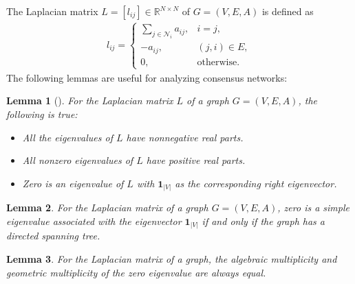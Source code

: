 \documentclass{ifacconf}
\newtheorem{lemma}{Lemma}[section]
\begin{document}
The Laplacian matrix $L = [l_{ij}] \in \mathbb{R}^{N \times N}$ of $G=({V}, {E}, A)$ is defined as
\begin{align}
l_{ij} = \left \{ \begin{array}{ll}
\sum_{j \in \mathcal{N}_{i}} a_{ij}, & i=j, \\
-a_{ij},  & (j,i) \in E,  \\
0, & \mathrm{otherwise}.
\end{array}	\right.	\nonumber
\end{align}
The following lemmas are useful for analyzing consensus networks:
\begin{lemma} [\cite{godsil2001algebraic}] \label{lemma_Laplacian_1} 
For the Laplacian matrix $L$ of a graph $G = (V,E,A)$, the following is true:
\begin{itemize}
    \item All the eigenvalues of $L$ have nonnegative real parts.
    \item All nonzero eigenvalues of $L$ have positive real parts.
    \item Zero is an eigenvalue of $L$ with $\mathbf{1}_{|V|}$ as the corresponding right eigenvector.
\end{itemize} 
\end{lemma}
\begin{lemma} \citep{lin2005necessary,ren2005consensus} \label{lemma_Laplacian_2}
For the Laplacian matrix of a graph $G = (V,E,A)$, zero is a simple eigenvalue associated with the eigenvector $\mathbf{1}_{|V|}$ if and only if the graph has a directed spanning tree.
\end{lemma}
\begin{lemma} \citep{mirzaev2013laplacian} \label{lem_zero_eigen_multiplicity}
For the Laplacian matrix of a graph, the algebraic multiplicity and geometric multiplicity of the zero eigenvalue are always equal.
\end{lemma} 
\end{document}
